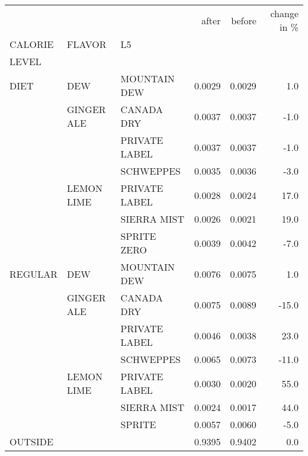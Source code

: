 \begin{tabular}{lllrrr}
\toprule
        &            &        &   after &  before &  change in \% \\
CALORIE  & FLAVOR & L5 &         &         &                    \\
LEVEL \\
\midrule
DIET    & DEW        & MOUNTAIN DEW              &  0.0029 &  0.0029 &                1.0 \\
        & GINGER ALE & CANADA DRY                &  0.0037 &  0.0037 &               -1.0 \\
        &            & PRIVATE LABEL             &  0.0037 &  0.0037 &               -1.0 \\
        &            & SCHWEPPES                 &  0.0035 &  0.0036 &               -3.0 \\
        & LEMON LIME & PRIVATE LABEL             &  0.0028 &  0.0024 &               17.0 \\
        &            & SIERRA MIST               &  0.0026 &  0.0021 &               19.0 \\
        &            & SPRITE ZERO               &  0.0039 &  0.0042 &               -7.0 \\
REGULAR & DEW        & MOUNTAIN DEW              &  0.0076 &  0.0075 &                1.0 \\
        & GINGER ALE & CANADA DRY                &  0.0075 &  0.0089 &              -15.0 \\
        &            & PRIVATE LABEL             &  0.0046 &  0.0038 &               23.0 \\
        &            & SCHWEPPES                 &  0.0065 &  0.0073 &              -11.0 \\
        & LEMON LIME & PRIVATE LABEL             &  0.0030 &  0.0020 &               55.0 \\
        &            & SIERRA MIST               &  0.0024 &  0.0017 &               44.0 \\
        &            & SPRITE                    &  0.0057 &  0.0060 &               -5.0 \\
OUTSIDE &            &                           &  0.9395 &  0.9402 &                0.0 \\
\bottomrule
\end{tabular}
